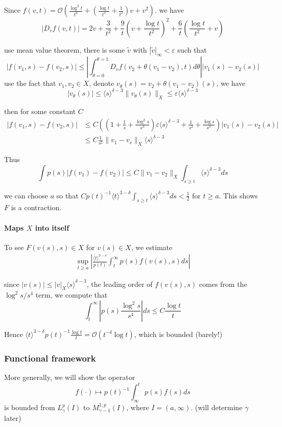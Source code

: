 \documentclass[letterpaper,11pt]{article}
\newcommand{\rmO}{\mathcal{O}}
\newcommand{\eps}{\varepsilon}
\numberwithin{equation}{section}
\theoremstyle{plain}
\begin{document}
Since $f(v,t)=\rmO\left(\frac{\log^2 t}{t^4}+(\frac{\log t}{t^3}+\frac{1}{t^2}) v+v^2\right)$. we have
\[
|D_vf(v,t)| = 2v+\frac{3}{t^2} +\frac{9}{t}\left(v+\frac{\log t}{t^2}\right)^2+\frac{6}{t}\left(\frac{\log t}{t^2}+v\right)
\]

use mean value theorem, there is some $\tilde{v}$ with $|\tilde{v}|_\infty < \eps$ such that
\[
|f(v_1,s)-f(v_2,s)| \le \left| \int_{\theta=0}^{\theta=1} D_vf(v_2+\theta(v_1-v_2),t)d\theta \right||v_1(s)-v_2(s)|
\]
use the fact that $v_1,v_2 \in X$, denote $v_\theta(s)=v_2+\theta(v_1-v_2)(s)$, we have 
\[
|v_\theta(s)| \le \langle s\rangle^{\delta-3}\|v_\theta(s)\|_X \le \eps \langle s\rangle^{\delta-3}
\]

then for some constant $C$
\begin{align*}
|f(v_1,s)-f(v_2,s)| &\le C \left((1+\frac{1}{s}+\frac{\log^2 s}{s^3}) \eps \langle s\rangle^{\delta-3} + \frac{1}{s^2}+\frac{\log s}{s^3}\right)|v_1(s)-v_2(s)|\\
&\le C \frac{1}{s^2} \|v_1-v_s\|_X \langle s\rangle^{\delta-3}
\end{align*}

Thus 
\[
\int p(s)|f(v_1)-f(v_2)| \le C\|v_1-v_2\|_X \int_{s\ge t} \langle s\rangle ^{\delta-3}ds 
\]

we can choose $a$ so that $Cp(t)^{-1}\langle t \rangle^{3-\delta}\int_{s\ge t} \langle s\rangle ^{\delta-3}ds < \frac{1}{2}$ for $t\ge a$. This shows $F$ is a contraction.

\paragraph{Maps $X$ into itself}
To see $F(v(s),s) \in X$ for $v(s) \in X$, we estimate 
\begin{align*}
\sup_{t \ge a} \left|\frac{\langle t \rangle^{3-\delta} }{p(t)} \int_t^\infty p(s)f(v(s),s) ds \right|
\end{align*}

since $|v(s)| \le |v|_X \langle s\rangle^{\delta-3}$, the leading order of $f(v(s),s)$ comes from the $\log^2 s/s^4$ term, we compute that 
\[
\int_t^\infty |p(s) \frac{\log^2 s}{s^4}| ds \le C \frac{\log t}{t}
 \]

Hence $\langle t \rangle^{3-\delta}p(t)^{-1} \frac{\log t}{t} = \rmO (t^{-\delta}\log t)$, which is bounded (barely!)


\subsubsection{Functional framework}
More generally, we will show the operator
\[
f(\cdot) \mapsto p(t)^{-1}\int_{\infty}^t p(s)f(s)ds
\] 
is bounded from $L^p_{\gamma}(I)$ to $M^{1,p}_{\gamma-1}(I)$, where $I = (a,\infty)$. (will determine $\gamma$ later)
\end{document}
